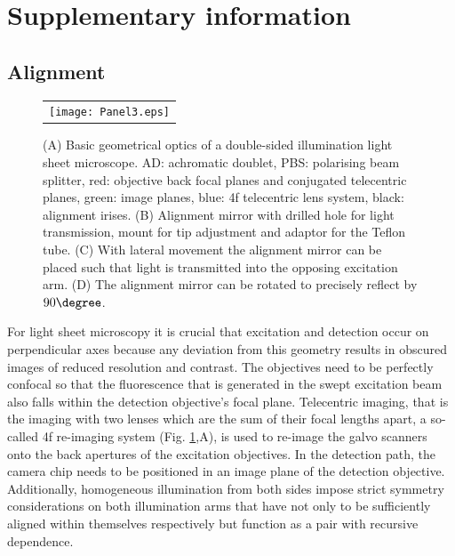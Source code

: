 \documentclass[12pt]{spieman}  %
\begin{document}

\section{Supplementary information}

\subsection{Alignment}

\begin{figure}
   \begin{center}
   \begin{tabular}{c}
   \texttt{[image: Panel3.eps]}
   \end{tabular}
   \end{center}
   \caption{\label{fig:alignment} (A) Basic geometrical optics of a double-sided illumination light sheet microscope. AD: achromatic doublet, PBS: polarising beam splitter, red: objective back focal planes and conjugated telecentric planes, green: image planes, blue: 4f telecentric lens system, black: alignment irises. (B) Alignment mirror with drilled hole for light transmission, mount for tip adjustment and adaptor for the Teflon tube. (C) With lateral movement the alignment mirror can be placed such that light is transmitted into the opposing excitation arm. (D) The alignment mirror can be rotated to precisely reflect by $90\degree$.} 
   \end{figure}

For light sheet microscopy it is crucial that excitation and detection occur on perpendicular axes because any deviation from this geometry results in obscured images of reduced resolution and contrast. The objectives need to be perfectly confocal so that the fluorescence that is generated in the swept excitation beam also falls within the detection objective's focal plane. Telecentric imaging, that is the imaging with two lenses which are the sum of their focal lengths apart, a so-called 4f re-imaging system (Fig. \ref{fig:alignment},A), is used to re-image the galvo scanners onto the back apertures of the excitation objectives. In the detection path, the camera chip needs to be positioned in an image plane of the detection objective. Additionally, homogeneous illumination from both sides impose strict symmetry considerations on both illumination arms that have not only to be sufficiently aligned within themselves respectively but function as a pair with recursive dependence. 
\end{document}
